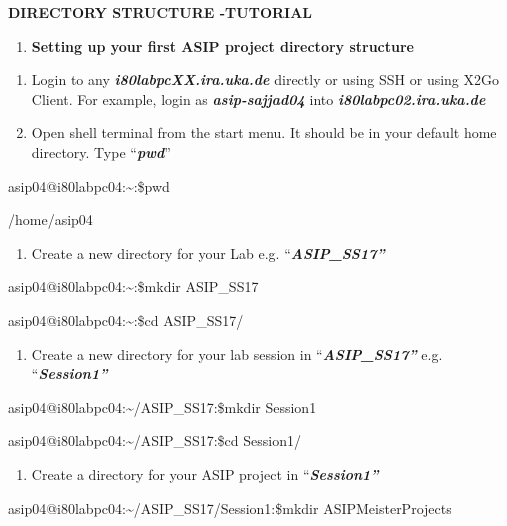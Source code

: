 \documentclass[
]{article}
\author{}
\date{}
\begin{document}
\textbf{DIRECTORY STRUCTURE -TUTORIAL}

\begin{enumerate}
\def\labelenumi{\Alph{enumi}.}
\item
  \textbf{Setting up your first ASIP project directory structure}
\end{enumerate}

\begin{enumerate}
\def\labelenumi{\arabic{enumi}.}
\item
  Login to any \emph{\textbf{i80labpcXX.ira.uka.de}} directly or using
  SSH or using X2Go Client. For example, login as
  \emph{\textbf{asip-sajjad04}} into
  \emph{\textbf{i80labpc02.ira.uka.de}}
\item
  Open shell terminal from the start menu. It should be in your default
  home directory. Type ``\emph{\textbf{pwd}}''
\end{enumerate}

asip04@i80labpc04:\textasciitilde:\$pwd

/home/asip04

\begin{enumerate}
\def\labelenumi{\arabic{enumi}.}
\setcounter{enumi}{2}
\item
  Create a new directory for your Lab e.g.
  ``\emph{\textbf{ASIP\_SS17''}}
\end{enumerate}

asip04@i80labpc04:\textasciitilde:\$mkdir ASIP\_SS17

asip04@i80labpc04:\textasciitilde:\$cd ASIP\_SS17/

\begin{enumerate}
\def\labelenumi{\arabic{enumi}.}
\setcounter{enumi}{3}
\item
  Create a new directory for your lab session in
  ``\emph{\textbf{ASIP\_SS17''}} e.g. ``\emph{\textbf{Session1''}}
\end{enumerate}

asip04@i80labpc04:\textasciitilde/ASIP\_SS17:\$mkdir Session1

asip04@i80labpc04:\textasciitilde/ASIP\_SS17:\$cd Session1/

\begin{enumerate}
\def\labelenumi{\arabic{enumi}.}
\setcounter{enumi}{4}
\item
  Create a directory for your ASIP project in
  ``\emph{\textbf{Session1''}}
\end{enumerate}

asip04@i80labpc04:\textasciitilde/ASIP\_SS17/Session1:\$mkdir
ASIPMeisterProjects
\end{document}
